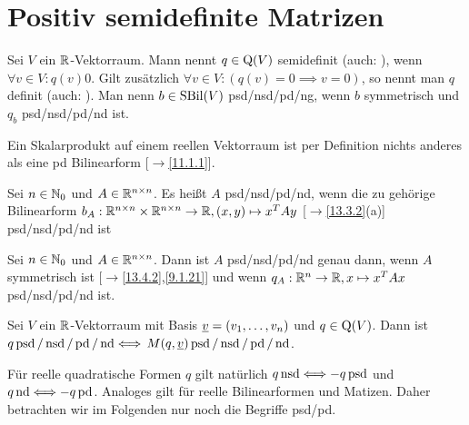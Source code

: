 \documentclass[../../main.tex]{subfiles}
\begin{document}
\section{Positiv semidefinite Matrizen}

\begin{df}\label{14.2.1}
    Sei $V$ ein $\mathbb R$-Vektorraum. Mann nennt $q\in\operatorname{Q}(V)$  semidefinit (auch: ), wenn $\forall v\in V: q(v)$\case{$\ge$}{$\le$}$0$. Gilt zusätzlich $\forall v\in V: (q(v)=0\implies v=0)$, so nennt man $q$  definit (auch: ). Man nenn $b\in \operatorname{SBil}(V)$ psd/nsd/pd/ng, wenn $b$ symmetrisch und $q_b$ psd/nsd/pd/nd ist.
\end{df}

\begin{bsp}\label{14.2.2}
    Ein Skalarprodukt auf einem reellen Vektorraum ist per Definition nichts anderes als eine pd Bilinearform [$\to$\ref{11.1.1}].
\end{bsp}
	
\begin{df}\label{14.2.3}
    Sei $n\in \mathbb N_0$ und $A\in \mathbb R^{n\times n}$. Es heißt $A$ psd/nsd/pd/nd, wenn die zu gehörige Bilinearform $b_A: \mathbb R^{n\times n}\times \mathbb R^{n\times n}\to \mathbb R, (x,y)\mapsto x^TAy$ [$\to$\ref{13.3.2}(a)] psd/nsd/pd/nd ist
\end{df}

\begin{bem}\label{14.2.4}
    Sei $n\in \mathbb N_0$ und $A\in \mathbb R^{n\times n}$. Dann ist $A$ psd/nsd/pd/nd genau dann, wenn $A$ symmetrisch ist [$\to$\ref{13.4.2},\ref{9.1.21}] und wenn $q_A: \mathbb R^n\to \mathbb R, x\mapsto x^TAx$ psd/nsd/pd/nd ist.
\end{bem}
	
\begin{bem}\label{14.2.5}
    Sei $V$ ein $\mathbb R$-Vektorraum mit Basis ${\underline v}=(v_1,\ldots ,v_n)$ und $q\in\operatorname{Q}(V)$. Dann ist $q \operatorname{psd}/\operatorname{nsd}/\operatorname{pd}/\operatorname{nd} \Longleftrightarrow$ $M(q,{\underline v}) \operatorname{psd}/\operatorname{nsd}/\operatorname{pd}/\operatorname{nd}$.
\end{bem}

\begin{bem}\label{14.2.6}
    Für reelle quadratische Formen $q$ gilt natürlich $q\operatorname{nsd}\Longleftrightarrow -q \operatorname{psd}$ und $q\operatorname{nd}\Longleftrightarrow -q \operatorname{pd}$. Analoges gilt für reelle Bilinearformen und Matizen. Daher betrachten wir im Folgenden nur noch die Begriffe psd/pd.
\end{bem}
\end{document}
